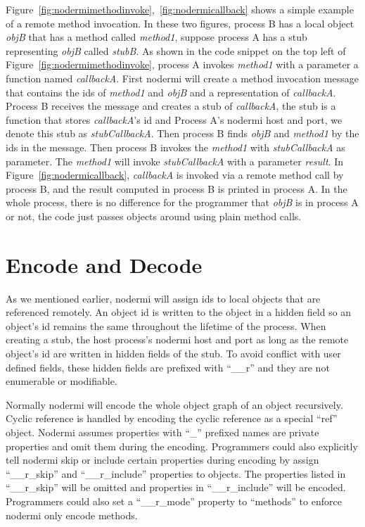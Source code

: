 Figure~\ref{fig:nodermimethodinvoke},~\ref{fig:nodermicallback} shows a simple example
of a remote method invocation.
In these two figures, process B has a local object \emph{objB} that has a method called \emph{method1},
suppose process A has a stub representing \emph{objB} called \emph{stubB}.
As shown in the code snippet on the top left of Figure~\ref{fig:nodermimethodinvoke},
process A invokes \emph{method1} with a parameter a function named \emph{callbackA}.
First nodermi will create a method invocation message that contains
the ids of \emph{method1} and \emph{objB} and a representation of \emph{callbackA}.
Process B receives the message and creates a stub of \emph{callbackA},
the stub is a function that stores \emph{callbackA}'s id and Process A's nodermi host and port,
we denote this stub as \emph{stubCallbackA}.
Then process B finds \emph{objB} and \emph{method1} by the ids in the message.
Then process B invokes the \emph{method1} with \emph{stubCallbackA} as parameter.
The \emph{method1} will invoke \emph{stubCallbackA} with a parameter \emph{result}.
In Figure~\ref{fig:nodermicallback}, \emph{callbackA} is invoked
via a remote method call by process B,
and the result computed in process B is printed in process A.
In the whole process, there is no difference for the programmer that \emph{objB}
is in process A or not, the code just passes objects around using plain method calls.



\section{Encode and Decode}
As we mentioned earlier, nodermi will assign ids to local
objects that are referenced remotely.
An object id is written to the object in a hidden field
so an object's id remains the same throughout the lifetime of the process.
When creating a stub,
the host process's nodermi host and port as long as the remote object's id
are written in hidden fields of the stub.
To avoid conflict with user defined fields, these hidden fields are prefixed
with ``\_\_r'' and they are not enumerable or modifiable.

Normally nodermi will encode the whole object graph of an object recursively.
Cyclic reference is handled by encoding the cyclic reference as
a special ``ref'' object.
Nodermi assumes properties with ``_'' prefixed names are private
properties and omit them during the encoding.
Programmers could also explicitly tell nodermi skip or include
certain properties during encoding by assign
``\_\_r\_skip'' and ``\_\_r\_include'' properties to objects.
The properties listed in ``\_\_r\_skip'' will be omitted and
properties in ``\_\_r\_include'' will be encoded.
Programmers could also set a ``\_\_r\_mode'' property to ``methods''
to enforce nodermi only encode methods.

